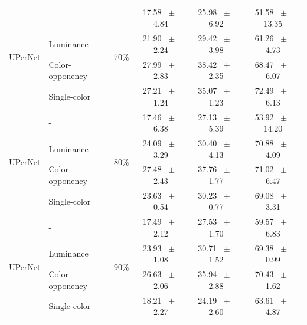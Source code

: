 \begin{table}[h]
\begin{tabular}{@{}l l c c c c@{}}
    \multirow{4}{*}{UPerNet} & - & \multirow{4}{*}{70\%} & 17.58 ~$\pm$~ 4.84 & 25.98 ~$\pm$~ 6.92 & 51.58 ~$\pm$~ 13.35 \\
    & Luminance &  & 21.90 ~$\pm$~ 2.24 & 29.42 ~$\pm$~ 3.98 & 61.26 ~$\pm$~ 4.73 \\
    & Color-opponency &  & 27.99 ~$\pm$~ 2.83 & 38.42 ~$\pm$~ 2.35 & 68.47 ~$\pm$~ 6.07 \\
    & Single-color &  & 27.21 ~$\pm$~ 1.24 & 35.07 ~$\pm$~ 1.23 & 72.49 ~$\pm$~ 6.13 \\
    \midrule
    \multirow{4}{*}{UPerNet} & - & \multirow{4}{*}{80\%} & 17.46 ~$\pm$~ 6.38 & 27.13 ~$\pm$~ 5.39 & 53.92 ~$\pm$~ 14.20 \\
    & Luminance &  & 24.09 ~$\pm$~ 3.29 & 30.40 ~$\pm$~ 4.13 & 70.88 ~$\pm$~ 4.09 \\
    & Color-opponency &  & 27.48 ~$\pm$~ 2.43 & 37.76 ~$\pm$~ 1.77 & 71.02 ~$\pm$~ 6.47 \\
    & Single-color &  & 23.63 ~$\pm$~ 0.54 & 30.23 ~$\pm$~ 0.77 & 69.08 ~$\pm$~ 3.31 \\
    \midrule
    \multirow{4}{*}{UPerNet} & - & \multirow{4}{*}{90\%} & 17.49 ~$\pm$~ 2.12 & 27.53 ~$\pm$~ 1.70 & 59.57 ~$\pm$~ 6.83 \\
    & Luminance &  & 23.93 ~$\pm$~ 1.08 & 30.71 ~$\pm$~ 1.52 & 69.38 ~$\pm$~ 0.99 \\
    & Color-opponency &  & 26.63 ~$\pm$~ 2.06 & 35.94 ~$\pm$~ 2.88 & 70.43 ~$\pm$~ 1.62 \\
    & Single-color &  & 18.21 ~$\pm$~ 2.27 & 24.19 ~$\pm$~ 2.60 & 63.61 ~$\pm$~ 4.87 \\
    \midrule
    \bottomrule
  \end{tabular}
  \label{tab:upernet_acdc_snow}
\end{table}